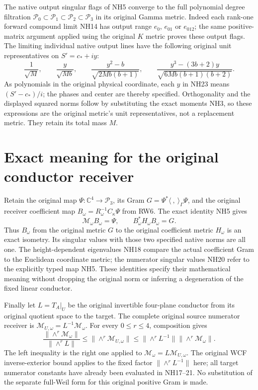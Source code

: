 \documentclass[11pt]{article}
\newcommand{\C}{\mathbb C}
\begin{document}
The native output singular flags of NH5 converge to the full
polynomial degree filtration $\mathcal P_0\subset\mathcal P_1
\subset\mathcal P_2\subset\mathcal P_3$ in its original
Gamma metric. Indeed each rank-one forward compound limit
NH14 has output range $e_0$, $e_{01}$ or $e_{012}$; the
same positive-matrix argument applied using the original
$K$ metric proves these output flags. The limiting individual
native output lines have the following original unit
representatives on $S'=c_*+iy$:
\[
 \frac1{\sqrt M},\qquad
 \frac{y}{\sqrt{Mb}},\qquad
 \frac{y^2-b}{\sqrt{2Mb(b+1)}},\qquad
 \frac{y^3-(3b+2)y}{\sqrt{6Mb(b+1)(b+2)}}.
 \tag{NH23}
\]
As polynomials in the original physical coordinate, each $y$
in NH23 means $(S'-c_*)/i$; the phases and center are thereby
specified. Orthogonality and the displayed squared norms
follow by substituting the exact moments NH3, so these
expressions are the original metric's unit representatives,
not a replacement metric. They retain its total mass $M$.

\section{Exact meaning for the original conductor receiver}
Retain the original map $\Psi:\C^4\to\mathcal P_3$,
its Gram $G=\Psi^*\langle\ ,\ \rangle_\Gamma\Psi$, and
the original receiver coefficient map
$B_\omega=R_\omega^{-1}C_\kappa\Psi$ from RW6. The exact
identity NH5 gives
\[
 \mathcal M_\omega B_\omega=\Psi,\qquad
 B_\omega^*H_\omega B_\omega=G.
 \tag{NH24}
\]
Thus $B_\omega$ from the original metric $G$ to the original
coefficient metric $H_\omega$ is an exact isometry. Its
singular values with those two specified native norms are
all one. The height-dependent eigenvalues NH18 compare the
actual coefficient Gram to the Euclidean coordinate metric;
the numerator singular values NH20 refer to the explicitly
typed map NH5. These identities specify their mathematical
meaning without dropping the original norm or inferring a
degeneration of the fixed linear conductor.

Finally let $L=T_A|_U$ be the original invertible four-plane
conductor from its original quotient space to the target.
The complete original source numerator receiver is
$\mathcal M_{U,\omega}=L^{-1}\mathcal M_\omega$. For every
$0\le r\le4$, composition gives
\[
 \frac{\|\wedge^r\mathcal M_\omega\|}{\|\wedge^rL\|}
 \le\|\wedge^r\mathcal M_{U,\omega}\|
 \le\|\wedge^rL^{-1}\|\|\wedge^r\mathcal M_\omega\|.
 \tag{NH25}
\]
The left inequality is the right one applied to
$\mathcal M_\omega=L\mathcal M_{U,\omega}$.
The original WCF inverse-exterior bound applies to the fixed
factor $\|\wedge^rL^{-1}\|$ here; all target numerator
constants have already been evaluated in NH17--21. No
substitution of the separate full-Weil form for this original
positive Gram is made.
\end{document}
